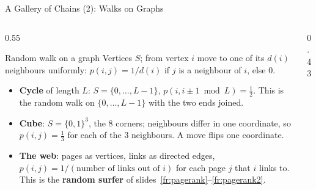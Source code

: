 \begin{frame}{A Gallery of Chains (2): Walks on Graphs}
  \label{fr:gallery2}
  \small
  \begin{columns}[T]
    \begin{column}{0.55\textwidth}
      \begin{block}{Random walk on a graph}
        Vertices $S$; from vertex $i$ move to one of its $d(i)$ neighbours uniformly: $p(i,j)=1/d(i)$ if $j$ is a neighbour of $i$, else $0$.
      \end{block}
      \begin{itemize}
        \item \textbf{Cycle} of length $L$: $S=\{0,\dots,L-1\}$, $p(i,i\pm1\bmod L)=\tfrac12$. This is the random walk on $\{0,\dots,L-1\}$ with the two ends joined.
        \item \textbf{Cube}: $S=\{0,1\}^3$, the $8$ corners; neighbours differ in one coordinate, so $p(i,j)=\tfrac13$ for each of the $3$ neighbours. A move flips one coordinate.
        \item \textbf{The web}: pages as vertices, links as directed edges, $p(i,j)=1/(\text{number of links out of } i)$ for each page $j$ that $i$ links to. This is the \textbf{random surfer} of slides~\ref{fr:pagerank}--\ref{fr:pagerank2}.
      \end{itemize}
    \end{column}
    \begin{column}{0.43\textwidth}
      \centering
\end{column}
\end{columns}
\end{frame}

